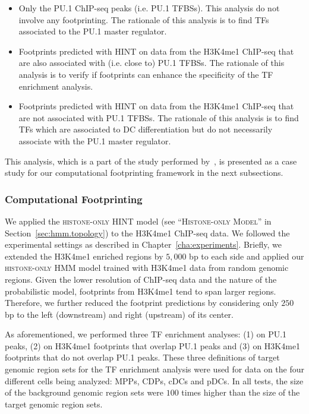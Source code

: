 \begin{itemize}
\item Only the PU.1 ChIP-seq peaks (i.e. PU.1 TFBSs). This analysis do not involve any footprinting. The rationale of this analysis is to find TFs associated to the PU.1 master regulator.
\item Footprints predicted with HINT on data from the H3K4me1 ChIP-seq that are also associated with (i.e. close to) PU.1 TFBSs. The rationale of this analysis is to verify if footprints can enhance the specificity of the TF enrichment analysis.
\item Footprints predicted with HINT on data from the H3K4me1 ChIP-seq that are not associated with PU.1 TFBSs. The rationale of this analysis is to find TFs which are associated to DC differentiation but do not necessarily associate with the PU.1 master regulator.
\end{itemize}

This analysis, which is a part of the study performed by~\cite{lin2015}, is presented as a case study for our computational footprinting framework in the next subsections.

\subsubsection{Computational Footprinting}

We applied the \textsc{histone-only} HINT model (see ``\textsc{Histone-only Model}'' in Section~\ref{sec:hmm.topology}) to the H3K4me1 ChIP-seq data. We followed the experimental settings as described in Chapter~\ref{cha:experiments}. Briefly, we extended the H3K4me1 enriched regions by $5,000$ bp to each side and applied our \textsc{histone-only} HMM model trained with H3K4me1 data from random genomic regions. Given the lower resolution of ChIP-seq data and the nature of the probabilistic model, footprints from H3K4me1 tend to span larger regions. Therefore, we further reduced the footprint predictions by considering only $250$ bp to the left (downstream) and right (upstream) of its center.

As aforementioned, we performed three TF enrichment analyses: (1) on PU.1 peaks, (2) on \linebreak H3K4me1 footprints that overlap PU.1 peaks and (3) on H3K4me1 footprints that do not overlap PU.1 peaks. These three definitions of target genomic region sets for the TF enrichment analysis were used for data on the four different cells being analyzed: MPPs, CDPs, cDCs and pDCs. In all tests, the size of the background genomic region sets were $100$ times higher than the size of the target genomic region sets.

